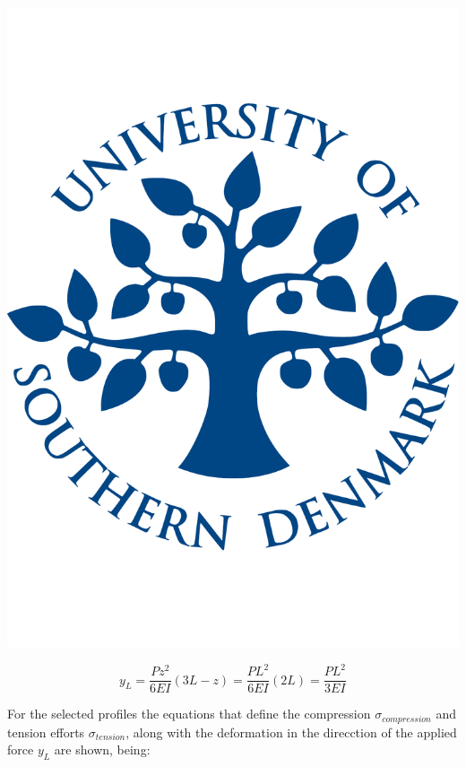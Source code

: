   \noindent\begin{minipage}{0.2\textwidth}%
    \includegraphics[width=\linewidth]{figures/sdu_logo.pdf}
  \end{minipage}%
  \hfill%
  \begin{minipage}{0.8\textwidth}
    \begin{equation}
    \label{eq:deformation}
      y_L = \frac{P z^2}{6EI}(3L-z) = \frac{P L^2}{6EI}(2L) = \frac{P L^2}{3EI}
    \end{equation}
  \end{minipage}


  For the selected profiles the equations that define the compression $\sigma _{compression}$ and tension efforts $\sigma _{tension}$, along with the deformation in the direcction of the applied force $y_L$ are shown, being:

